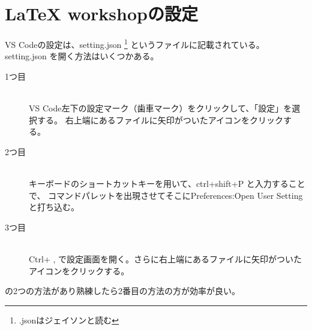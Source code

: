 \documentclass[titlepage]{ltjsarticle}
\begin{document}
\section{LaTeX workshopの設定}
VS Codeの設定は、setting.json
\footnote{.jsonはジェイソンと読む}
というファイルに記載されている。
setting.json を開く方法はいくつかある。
\begin{description}
  \item[1つ目] ~\\
    VS Code左下の設定マーク（歯車マーク）をクリックして、「設定」を選択する。
    右上端にあるファイルに矢印がついたアイコンをクリックする。
  \item[2つ目] ~\\
    キーボードのショートカットキーを用いて、ctrl+shift+P と入力することで、
    コマンドパレットを出現させてそこにPreferences:Open User Setting
    と打ち込む。
  \item[3つ目]~\\
    Ctrl+ , で設定画面を開く。さらに右上端にあるファイルに矢印がついたアイコンをクリックする。
\end{description}
の2つの方法があり熟練したら2番目の方法の方が効率が良い。
\end{document}
